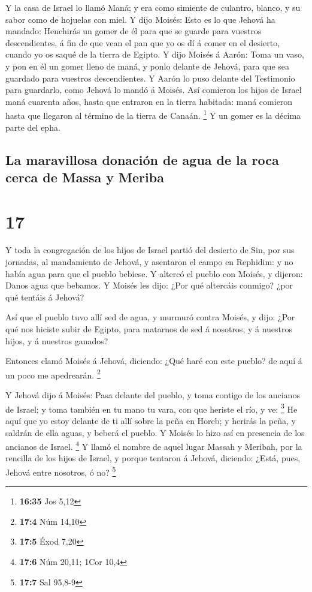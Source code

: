  Y la casa de Israel lo llamó Maná; y era como simiente
de culantro, blanco, y su sabor como de hojuelas con miel.
 Y dijo Moisés: Esto es lo que Jehová ha mandado:
Henchirás un gomer de él para que se guarde para vuestros descendientes,
á fin de que vean el pan que yo os dí á comer en el desierto, cuando yo
os saqué de la tierra de Egipto.  Y dijo Moisés á Aarón:
Toma un vaso, y pon en él un gomer lleno de maná, y ponlo delante de
Jehová, para que sea guardado para vuestros descendientes.
 Y Aarón lo puso delante del Testimonio para guardarlo,
como Jehová lo mandó á Moisés.  Así comieron los hijos de
Israel maná cuarenta años, hasta que entraron en la tierra habitada:
maná comieron hasta que llegaron al término de la tierra de Canaán.
\footnote{\textbf{16:35} Jos 5,12}  Y un gomer es la
décima parte del epha.

\hypertarget{la-maravillosa-donaciuxf3n-de-agua-de-la-roca-cerca-de-massa-y-meriba}{%
\subsection{La maravillosa donación de agua de la roca cerca de Massa y
Meriba}\label{la-maravillosa-donaciuxf3n-de-agua-de-la-roca-cerca-de-massa-y-meriba}}

\hypertarget{section-16}{%
\section{17}\label{section-16}}

 Y toda la congregación de los hijos de Israel partió del
desierto de Sin, por sus jornadas, al mandamiento de Jehová, y asentaron
el campo en Rephidim: y no había agua para que el pueblo bebiese.
 Y altercó el pueblo con Moisés, y dijeron: Danos agua que
bebamos. Y Moisés les dijo: ¿Por qué altercáis conmigo? ¿por qué tentáis
á Jehová?

 Así que el pueblo tuvo allí sed de agua, y murmuró contra
Moisés, y dijo: ¿Por qué nos hiciste subir de Egipto, para matarnos de
sed á nosotros, y á nuestros hijos, y á nuestros ganados?

 Entonces clamó Moisés á Jehová, diciendo: ¿Qué haré con
este pueblo? de aquí á un poco me apedrearán. \footnote{\textbf{17:4}
  Núm 14,10}

 Y Jehová dijo á Moisés: Pasa delante del pueblo, y toma
contigo de los ancianos de Israel; y toma también en tu mano tu vara,
con que heriste el río, y ve: \footnote{\textbf{17:5} Éxod 7,20}
 He aquí que yo estoy delante de ti allí sobre la peña en
Horeb; y herirás la peña, y saldrán de ella aguas, y beberá el pueblo. Y
Moisés lo hizo así en presencia de los ancianos de Israel. \footnote{\textbf{17:6}
  Núm 20,11; 1Cor 10,4}  Y llamó el nombre de aquel lugar
Massah y Meribah, por la rencilla de los hijos de Israel, y porque
tentaron á Jehová, diciendo: ¿Está, pues, Jehová entre nosotros, ó no?
\footnote{\textbf{17:7} Sal 95,8-9}

